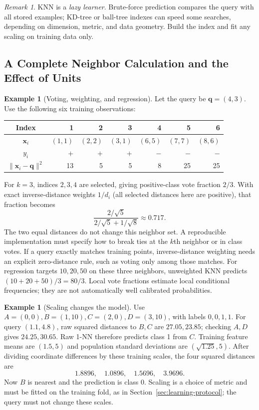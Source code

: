 \documentclass[11pt,twoside]{article}
\numberwithin{equation}{section}
\newcommand{\vect}[1]{\bm{#1}}
\theoremstyle{plain}
\theoremstyle{definition}
\newtheorem{example}[theorem]{Example}
\theoremstyle{remark}
\newtheorem{remark}[theorem]{Remark}
\begin{document}
\begin{remark}
KNN is a \emph{lazy learner}. Brute-force prediction compares the query with all stored examples; KD-tree or ball-tree indexes can speed some searches, depending on dimension, metric, and data geometry. Build the index and fit any scaling on training data only.
\end{remark}

\subsection{A Complete Neighbor Calculation and the Effect of Units}
\begin{example}[Voting, weighting, and regression]
Let the query be $\vect q=(4,3)$. Use the following six training observations:
\begin{center}
\begin{tabular}{c|rrrrrr}
Index & 1&2&3&4&5&6\\\hline
$\vect x_i$ & $(1,1)$&$(2,2)$&$(3,1)$&$(6,5)$&$(7,7)$&$(8,6)$\\
$y_i$ & $+$&$+$&$+$&$-$&$-$&$-$\\
$\|\vect x_i-\vect q\|^2$ &13&5&5&8&25&25
\end{tabular}
\end{center}
For $k=3$, indices $2,3,4$ are selected, giving positive-class vote fraction $2/3$. With exact inverse-distance weights $1/d_i$ (all selected distances here are positive), that fraction becomes
\[
\frac{2/\sqrt5}{2/\sqrt5+1/\sqrt8}\approx0.717.
\]
The two equal distances do not change this neighbor set. A reproducible implementation must specify how to break ties at the $k$th neighbor or in class votes. If a query exactly matches training points, inverse-distance weighting needs an explicit zero-distance rule, such as voting only among those matches. For regression targets $10,20,50$ on these three neighbors, unweighted KNN predicts $(10+20+50)/3=80/3$. Local vote fractions estimate local conditional frequencies; they are not automatically well calibrated probabilities.
\end{example}

\begin{example}[Scaling changes the model]
Use $A=(0,0),B=(1,10),C=(2,0),D=(3,10)$, with labels $0,0,1,1$. For query $(1.1,4.8)$, raw squared distances to $B,C$ are $27.05,23.85$; checking $A,D$ gives $24.25,30.65$. Raw 1-NN therefore predicts class 1 from $C$. Training feature means are $(1.5,5)$ and population standard deviations are $(\sqrt{1.25},5)$. After dividing coordinate differences by these training scales, the four squared distances are
\[
1.8896,\quad1.0896,\quad1.5696,\quad3.9696.
\]
Now $B$ is nearest and the prediction is class 0. Scaling is a choice of metric and must be fitted on the training fold, as in Section~\ref{sec:learning-protocol}; the query must not change these scales.
\end{example}
\end{document}

